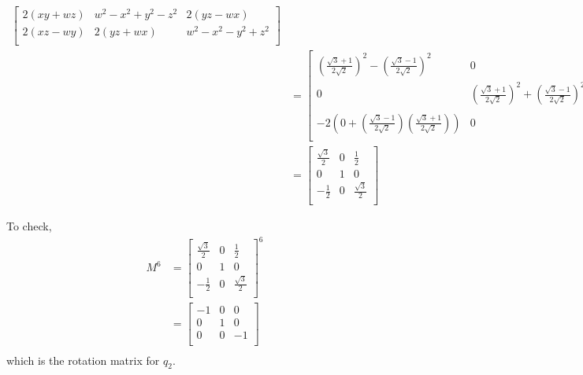 \documentclass[11pt, oneside]{article}
\begin{document}
\begin{enumerate}[Problem 1:]
\begin{enumerate}[1.]
\begin{align*}
\begin{bmatrix}
            2(xy+wz) & w^2-x^2+y^2-z^2 & 2(yz-wx)\\
            2(xz-wy) & 2(yz+wx) & w^2-x^2-y^2+z^2\\
          \end{bmatrix}\\
          &=
          \begin{bmatrix}
            {\left(\frac {\sqrt 3 + 1} {2\sqrt 2}\right)}^2 - {\left(\frac {\sqrt 3 - 1} {2\sqrt 2}\right)}^2 & 0 & 2\left(0+\left(\frac {\sqrt 3 - 1} {2\sqrt 2}\right)\left(\frac {\sqrt 3 + 1} {2\sqrt 2}\right)\right)\\
            0 & {\left(\frac {\sqrt 3 + 1} {2\sqrt 2}\right)}^2 + {\left(\frac {\sqrt 3 - 1} {2\sqrt 2}\right)}^2 & 0\\
            -2\left(0+\left(\frac {\sqrt 3 - 1} {2\sqrt 2}\right)\left(\frac {\sqrt 3 + 1} {2\sqrt 2}\right)\right) & 0 & {\left(\frac {\sqrt 3 + 1} {2\sqrt 2}\right)}^2 - {\left(\frac {\sqrt 3 - 1} {2\sqrt 2}\right)}^2\\
          \end{bmatrix}\\
          &=
          \begin{bmatrix}
            \frac {\sqrt 3} 2 & 0 & \frac 1 2 \\
            0 & 1 & 0 \\
            -\frac 1 2 & 0 & \frac {\sqrt 3} 2\\
          \end{bmatrix}
        \end{align*}

        To check,
        \begin{align*}
          M^6 &= 
          {\begin{bmatrix}
              \frac {\sqrt 3} 2 & 0 & \frac 1 2 \\
              0 & 1 & 0 \\
              -\frac 1 2 & 0 & \frac {\sqrt 3} 2\\
          \end{bmatrix}} ^ 6\\
          &=
          \begin{bmatrix}
            -1 & 0 & 0\\
            0 & 1 & 0 \\
            0 & 0 & -1\\
          \end{bmatrix}\\
        \end{align*}
        which is the rotation matrix for $q_2$.
    \end{enumerate}
\end{enumerate}
\end{document}
